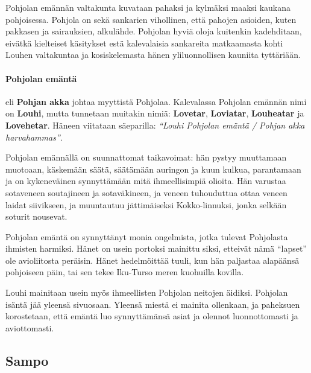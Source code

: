   Pohjolan emännän valtakunta kuvataan pahaksi ja kylmäksi maaksi kaukana pohjoisessa. Pohjola
  on sekä sankarien vihollinen, että pahojen asioiden, kuten pakkasen ja sairauksien, alkulähde.
  Pohjolan hyviä oloja kuitenkin kadehditaan, eivätkä kielteiset käsitykset estä kalevalaisia
  sankareita matkaamasta kohti Louhen valtakuntaa ja kosiskelemasta hänen yliluonnollisen kauniita
  tyttäriään.

  \paragraph{Pohjolan emäntä} eli \textbf{Pohjan akka} johtaa myyttistä Pohjolaa. Kalevalassa
  Pohjolan emännän nimi on \textbf{Louhi}, mutta tunnetaan muitakin nimiä: \textbf{Lovetar},
  \textbf{Loviatar}, \textbf{Louheatar} ja \textbf{Lovehetar}. Häneen viitataan säeparilla:
  \emph{``Louhi Pohjolan emäntä / Pohjan akka harvahammas''}.
  \par
  Pohjolan emännällä on suunnattomat taikavoimat: hän pystyy muuttamaan muotoaan, käskemään säätä,
  säätämään auringon ja kuun kulkua, parantamaan ja on kykeneväinen synnyttämään mitä
  ihmeellisimpiä olioita. Hän varustaa sotaveneen soutajineen ja sotaväkineen, ja veneen
  tuhouduttua ottaa veneen laidat siivikseen, ja muuntautuu jättimäiseksi Kokko-linnuksi, jonka
  selkään soturit nousevat.
  \par
  Pohjolan emäntä on synnyttänyt monia ongelmista, jotka tulevat Pohjolasta ihmisten harmiksi.
  Hänet on usein portoksi mainittu siksi, etteivät nämä ``lapset'' ole avioliitosta peräisin. Hänet
  hedelmöittää tuuli, kun hän paljastaa alapäänsä pohjoiseen päin, tai sen tekee Iku-Turso meren
  kuohuilla kovilla.
  \par
  Louhi mainitaan usein myös ihmeellisten Pohjolan neitojen äidiksi. Pohjolan isäntä jää yleensä
  sivuosaan. Yleensä miestä ei mainita ollenkaan, ja paheksuen korostetaan, että emäntä luo
  synnyttämänsä asiat ja olennot luonnottomasti ja aviottomasti.


\subsection{Sampo}

